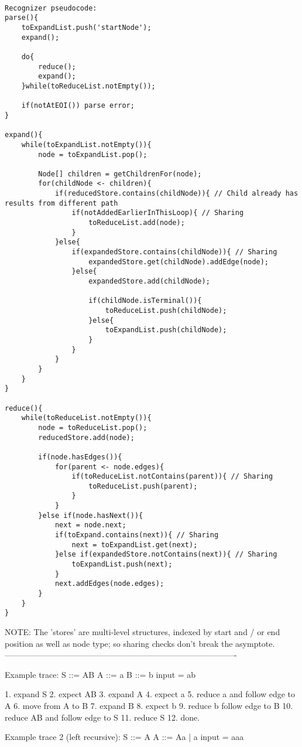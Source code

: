 \documentclass[a4paper,10pt]{article}
\begin{document}
\begin{verbatim}

Recognizer pseudocode:
parse(){
	toExpandList.push('startNode');
	expand();
	
	do{
		reduce();
		expand();
	}while(toReduceList.notEmpty());
	
	if(notAtEOI()) parse error;
}

expand(){
	while(toExpandList.notEmpty()){
		node = toExpandList.pop();
		
		Node[] children = getChildrenFor(node);
		for(childNode <- children){
			if(reducedStore.contains(childNode)){ // Child already has results from different path
				if(notAddedEarlierInThisLoop){ // Sharing
					toReduceList.add(node);
				}
			}else{
				if(expandedStore.contains(childNode)){ // Sharing
					expandedStore.get(childNode).addEdge(node);
				}else{
					expandedStore.add(childNode);
				
					if(childNode.isTerminal()){
						toReduceList.push(childNode);
					}else{
						toExpandList.push(childNode);
					}
				}
			}
		}
	}
}

reduce(){
	while(toReduceList.notEmpty()){
		node = toReduceList.pop();
		reducedStore.add(node);
		
		if(node.hasEdges()){
			for(parent <- node.edges){
				if(toReduceList.notContains(parent)){ // Sharing
					toReduceList.push(parent);
				}
			}
		}else if(node.hasNext()){
			next = node.next;
			if(toExpand.contains(next)){ // Sharing
				next = toExpandList.get(next);
			}else if(expandedStore.notContains(next)){ // Sharing
				toExpandList.push(next);
			}
			next.addEdges(node.edges);
		}
	}
}
\end{verbatim}

NOTE: The 'stores' are multi-level structures, indexed by start and / or end position as well as node type; so sharing checks don't break the asymptote.\\

-------------------------------------------------------------------------------------

Example trace:
S ::= AB
A ::= a
B ::= b
input = ab

1. expand S
2. expect AB
3. expand A
4. expect a
5. reduce a and follow edge to A
6. move from A to B
7. expand B
8. expect b
9. reduce b follow edge to B
10. reduce AB and follow edge to S
11. reduce S
12. done.


Example trace 2 (left recursive):
S ::= A
A ::= Aa | a
input = aaa
\end{document}
